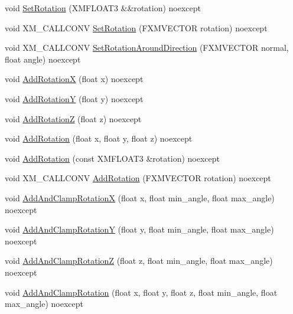 \begin{DoxyCompactItemize}
\item 
void \hyperlink{structmage_1_1_transform_node_aceda2ef578b04428dd7a271943daa8c8}{Set\+Rotation} (X\+M\+F\+L\+O\+A\+T3 \&\&rotation) noexcept
\item 
void X\+M\+\_\+\+C\+A\+L\+L\+C\+O\+NV \hyperlink{structmage_1_1_transform_node_a354d20ffedec33173a598718677f7a74}{Set\+Rotation} (F\+X\+M\+V\+E\+C\+T\+OR rotation) noexcept
\item 
void X\+M\+\_\+\+C\+A\+L\+L\+C\+O\+NV \hyperlink{structmage_1_1_transform_node_ac44727a692c1ef8d9e03e42526ac2b9d}{Set\+Rotation\+Around\+Direction} (F\+X\+M\+V\+E\+C\+T\+OR normal, float angle) noexcept
\item 
void \hyperlink{structmage_1_1_transform_node_a3914a0f0cfd6b2fdb64c087469a96188}{Add\+RotationX} (float x) noexcept
\item 
void \hyperlink{structmage_1_1_transform_node_a773d43d9237a57c15b05968b00f1f0ca}{Add\+RotationY} (float y) noexcept
\item 
void \hyperlink{structmage_1_1_transform_node_a42fd06a7b5e84efbdf9d8aee8cef64c1}{Add\+RotationZ} (float z) noexcept
\item 
void \hyperlink{structmage_1_1_transform_node_a499ab02f3685005d04e5f31383c5b85b}{Add\+Rotation} (float x, float y, float z) noexcept
\item 
void \hyperlink{structmage_1_1_transform_node_a4851628300467126db36aa28e6e2aa63}{Add\+Rotation} (const X\+M\+F\+L\+O\+A\+T3 \&rotation) noexcept
\item 
void X\+M\+\_\+\+C\+A\+L\+L\+C\+O\+NV \hyperlink{structmage_1_1_transform_node_af0bc80ccd27d20204e73496cdb68e14b}{Add\+Rotation} (F\+X\+M\+V\+E\+C\+T\+OR rotation) noexcept
\item 
void \hyperlink{structmage_1_1_transform_node_a0d9092b5dd1ebb55d22586d39e93ea56}{Add\+And\+Clamp\+RotationX} (float x, float min\+\_\+angle, float max\+\_\+angle) noexcept
\item 
void \hyperlink{structmage_1_1_transform_node_a12d2b7f8b6ec98fc14089c8bf51b9e7a}{Add\+And\+Clamp\+RotationY} (float y, float min\+\_\+angle, float max\+\_\+angle) noexcept
\item 
void \hyperlink{structmage_1_1_transform_node_a37a5616ad00c8ad1874dd2f96d29bd8c}{Add\+And\+Clamp\+RotationZ} (float z, float min\+\_\+angle, float max\+\_\+angle) noexcept
\item 
void \hyperlink{structmage_1_1_transform_node_a74cb0024a6f3bd0a14fcf652a434563f}{Add\+And\+Clamp\+Rotation} (float x, float y, float z, float min\+\_\+angle, float max\+\_\+angle) noexcept

\end{DoxyCompactItemize}
